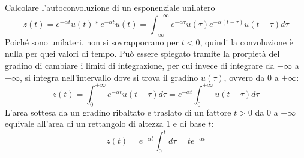 \documentclass{article}
\numberwithin{equation}{subsection}
\begin{document}
\begin{center}
\end{center}

Calcolare l'autoconvoluzione di un esponenziale unilatero
\begin{equation*}
    z(t)=e^{-\alpha t}u(t)*e^{-\alpha t}u(t)=\displaystyle\int_{-\infty}^{+\infty}e^{-\alpha\tau}u(\tau)e^{-\alpha(t-\tau)}u(t-\tau)d\tau
\end{equation*}
Poiché sono unilateri, non si sovrapporrano per $t<0$, quindi la convoluzione è nulla per quei valori di tempo. Può essere spiegato tramite la prorpietà del gradino di 
cambiare i limiti di integrazione, per cui invece di integrare da $-\infty$ a $+\infty$, si integra nell'intervallo dove si trova il gradino $u(\tau)$, ovvero da $0$ a $+\infty$: 
\begin{equation*}
    z(t)=\displaystyle\int_0^{+\infty}e^{-\alpha t}u(t-\tau)d\tau=e^{-\alpha t}\int_0^{+\infty}u(t-\tau)d\tau
\end{equation*}
L'area sottesa da un gradino ribaltato e traslato di un fattore $t>0$ da $0$ a $+\infty$ equivale all'area di un rettangolo di altezza $1$ e di base $t$:
\begin{equation*}
    z(t)=e^{-\alpha t}\displaystyle\int_0^td\tau=te^{-\alpha t}
\end{equation*}
\end{document}
